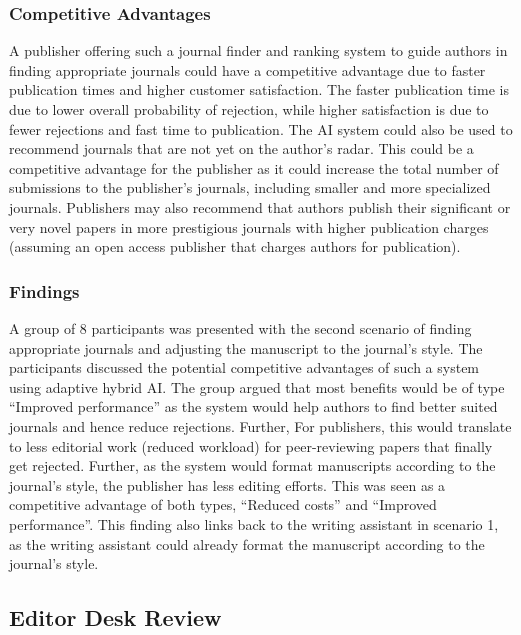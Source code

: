 \subsubsection*{Competitive Advantages} 

A publisher offering such a journal finder and ranking system to guide authors in finding appropriate journals could have a competitive
advantage due to  faster publication times and higher customer satisfaction. The faster publication time is due to lower overall 
probability of rejection, while higher satisfaction is due to fewer rejections and fast time to publication. The AI system could also
be used to recommend journals that are not yet on the author's radar. This could be a competitive advantage for the publisher as it
could increase the total number of submissions to the publisher's journals, including smaller and more specialized journals. Publishers 
may also recommend that authors publish their significant or very novel papers in more prestigious journals with higher publication 
charges (assuming an open access publisher that charges authors for publication).

\subsubsection*{Findings}

A group of 8 participants was presented with the second scenario of finding appropriate journals and adjusting the manuscript to the
journal's style. The participants discussed the potential competitive advantages of such a system using adaptive hybrid AI. The group 
argued that most benefits would be of type ``Improved performance'' as the system would help authors to find better suited journals and
hence reduce rejections. Further, For publishers, this would translate to less editorial work (reduced workload) for peer-reviewing
papers that finally get rejected. Further, as the system would format manuscripts according to the journal's style, the publisher has
less editing efforts. This was seen as a competitive advantage of both types, ``Reduced costs'' and ``Improved performance''. This 
finding also links back to the writing assistant in scenario 1, as the writing assistant could already format the manuscript according
to the journal's style.

\subsection{Editor Desk Review}

